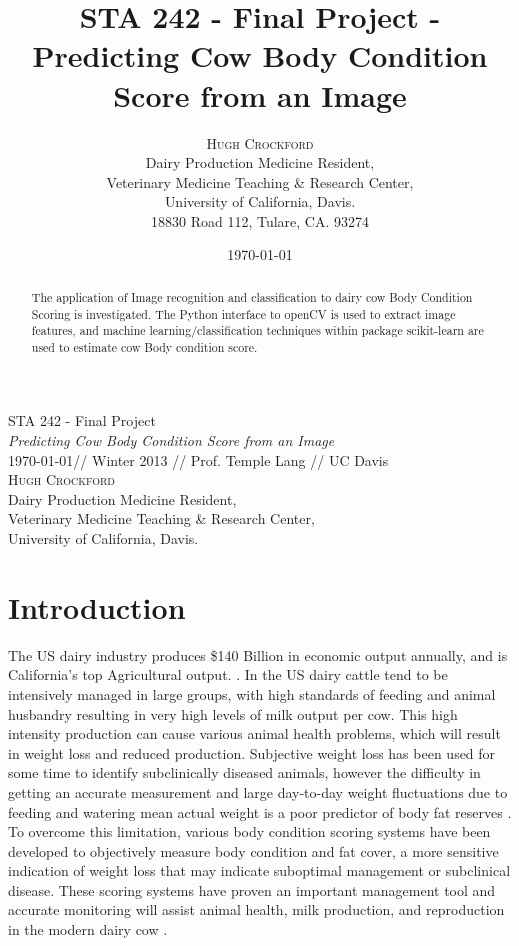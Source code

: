 \documentclass[11pt]{article}
\title{STA 242 - Final Project - Predicting Cow Body Condition Score from an Image}
\author{\Large{\textsc{Hugh Crockford}}\vspace{0.25in}\\
	Dairy Production Medicine Resident,\\
	Veterinary Medicine Teaching \& Research Center,\\
	University of California, Davis.\\
	18830 Road 112, Tulare, CA. 93274\\
}
\date{\today}
\begin{document}
\begin{center}
	\vspace*{0.3in}
	\LARGE STA 242 - Final Project \\ 
	\Large \emph{Predicting Cow Body Condition Score from an Image} \\ 
	\vspace{0.25in}
	\normalsize \today  // Winter 2013 // Prof. Temple Lang // UC Davis\\ 
	\vspace{0.25in}
	\textsc{Hugh Crockford}\\
	\vspace{0.1in}
	Dairy Production Medicine Resident,\\
	Veterinary Medicine Teaching \& Research Center,\\
	University of California, Davis.\\
\end{center}


	\tableofcontents

	\begin{abstract}
		The application of Image recognition and classification to dairy cow Body Condition Scoring is investigated.
		The Python interface to openCV is used to extract image features, and machine learning/classification techniques within package scikit-learn are used to estimate cow Body condition score.
	\end{abstract}

\newpage
\section{Introduction}
		The US dairy industry produces \$140 Billion in economic output annually, and is California's top Agricultural output. \cite{cmab13}. 
		In the US dairy cattle tend to be intensively managed in large groups, with high standards of feeding and animal husbandry resulting in very high levels of milk output per cow.
		This high intensity production can cause various animal health problems, which will result in weight loss and reduced production.
		Subjective weight loss has been used for some time to identify subclinically diseased animals, however the difficulty in getting an accurate measurement and large day-to-day weight fluctuations due to feeding and watering mean actual weight is a poor predictor of body fat reserves\cite{Roche2004} .
		To overcome this limitation, various body condition scoring systems have been developed to objectively measure body condition and fat cover, a more sensitive indication of weight loss that may indicate suboptimal management or subclinical disease\cite{Wildman1982}.
		These scoring systems have proven an important management tool and accurate monitoring will assist animal health, milk production, and reproduction in the modern dairy cow \cite{Buckley2003}.
\end{document}
